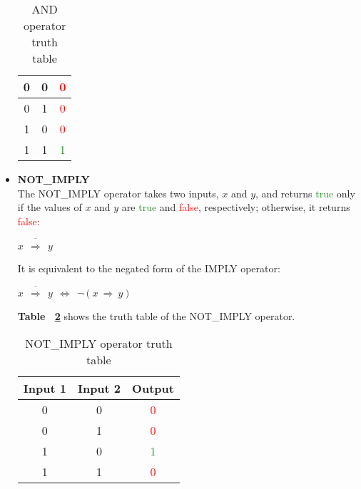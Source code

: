 \documentclass[]{usiinfbachelorproject}
\begin{document}
\begin{itemize}
\begin{table}[H]
\begin{tabular}{|c|c|c|}
                0 & 0 & \textcolor{red}{0} \\
                \hline
                0 & 1 & \textcolor{red}{0} \\
                \hline
                1 & 0 & \textcolor{red}{0} \\
                \hline
                1 & 1 & \textcolor{ForestGreen}{1} \\
                \hline
            \end{tabular}
            \caption{AND operator truth table}
            \label{tab:and-table}
        \end{table}
    \item \textbf{NOT\_IMPLY}
        \vspace{0.2cm} \\
        The NOT\_IMPLY operator takes two inputs, $x$ and $y$, and returns \textcolor{ForestGreen}{true} only if the values of $x$ and $y$ are \textcolor{ForestGreen}{true} and \textcolor{red}{false}, respectively; otherwise, it returns \textcolor{red}{false}:
        \begin{center}
            $x \ \ \overline{\Longrightarrow} \ \ y$
        \end{center}
        It is equivalent to the negated form of the IMPLY operator:
        \begin{center}
            $x \ \ \overline{\Longrightarrow} \ \ y \ \ \Longleftrightarrow \ \ \neg(x \ \Longrightarrow \ y)$
        \end{center}
        \textbf{Table ~\ref{tab:not-imply-table}} shows the truth table of the NOT\_IMPLY operator.
        \begin{table}[H]
            \centering
            \begin{tabular}{|c|c|c|}
                \hline
                \textbf{Input 1} & \textbf{Input 2} & \textbf{Output} \\ \hline
                0 & 0 & \textcolor{red}{0} \\
                \hline
                0 & 1 & \textcolor{red}{0} \\
                \hline
                1 & 0 & \textcolor{ForestGreen}{1} \\
                \hline
                1 & 1 & \textcolor{red}{0} \\
                \hline
            \end{tabular}
            \caption{NOT\_IMPLY operator truth table}
            \label{tab:not-imply-table}
        \end{table}

\end{itemize}
\end{document}
